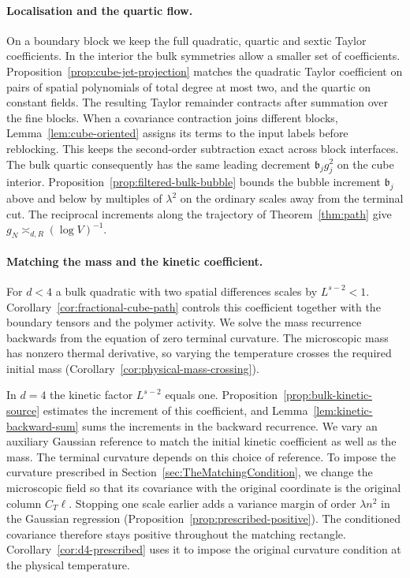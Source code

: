 \documentclass[11pt]{article}
\theoremstyle{definition}
\begin{document}
\paragraph{Localisation and the quartic flow.}
On a boundary block we keep the full quadratic, quartic and sextic
Taylor coefficients. In the interior the bulk symmetries allow a
smaller set of coefficients. Proposition~\ref{prop:cube-jet-projection}
matches the quadratic Taylor coefficient on pairs of spatial
polynomials of total degree at most two, and the quartic on constant
fields. The resulting Taylor remainder contracts after summation
over the fine blocks. When a covariance contraction joins different
blocks, Lemma~\ref{lem:cube-oriented} assigns its terms to the input
labels before reblocking. This keeps the second-order subtraction
exact across block interfaces. The bulk quartic consequently has
the same leading decrement \(\mathfrak b_j g_j^2\) on the cube
interior. Proposition~\ref{prop:filtered-bulk-bubble} bounds the
bubble increment \(\mathfrak b_j\) above and below by multiples of
\(\lambda^2\) on the ordinary scales away from the terminal cut.
The reciprocal increments along the trajectory of
Theorem~\ref{thm:path} give \(g_N\asymp_{d,R}(\log V)^{-1}\).

\paragraph{Matching the mass and the kinetic coefficient.}
For \(d<4\) a bulk quadratic with two spatial differences scales
by \(L^{s-2}<1\). Corollary~\ref{cor:fractional-cube-path} controls
this coefficient together with the boundary tensors and the polymer
activity. We solve the mass recurrence backwards from the equation of
zero terminal curvature. The microscopic mass has nonzero thermal
derivative, so varying the temperature crosses the required initial
mass (Corollary~\ref{cor:physical-mass-crossing}).

In \(d=4\) the kinetic factor \(L^{s-2}\) equals one.
Proposition~\ref{prop:bulk-kinetic-source} estimates the increment
of this coefficient, and Lemma~\ref{lem:kinetic-backward-sum} sums
the increments in the backward recurrence. We vary an auxiliary
Gaussian reference to match the initial kinetic coefficient as well
as the mass. The terminal curvature depends on this choice of
reference. To impose the curvature prescribed in
Section~\ref{sec:TheMatchingCondition}, we change the microscopic
field so that its covariance with the original coordinate is the
original column \(C_T\ell\). Stopping one scale earlier adds a
variance margin of order \(\lambda n^2\) in the Gaussian regression
(Proposition~\ref{prop:prescribed-positive}). The conditioned
covariance therefore stays positive throughout the matching rectangle.
Corollary~\ref{cor:d4-prescribed} uses it to impose the original
curvature condition at the physical temperature.
\end{document}

